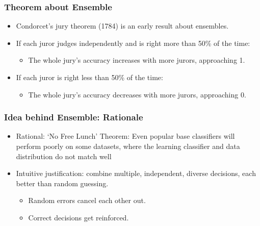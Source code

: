 \begin{frame}[fragile]\frametitle{Theorem about Ensemble}
\begin{itemize}
\item Condorcet's jury theorem (1784) is an early result about ensembles.
\item If each juror judges independently and is right more than 50\% of the time:
\begin{itemize}
\item The whole jury's accuracy increases with more jurors, approaching 1.
\end{itemize}
\item If each juror is right less than 50\% of the time:
\begin{itemize}
\item The whole jury's accuracy decreases with more jurors, approaching 0.
\end{itemize}
\end{itemize}
\end{frame}

\begin{frame}[fragile]\frametitle{Idea behind Ensemble: Rationale}
\begin{itemize}
\item Rational: `No Free Lunch' Theorem: Even popular base classifiers will perform poorly on some datasets, where the learning classifier and data distribution do not match well
\item Intuitive justification: combine multiple, independent, diverse decisions, each better than random guessing.
\begin{itemize}
\item Random errors cancel each other out.
\item Correct decisions get reinforced.
\end{itemize}
\end{itemize}
\end{frame}

